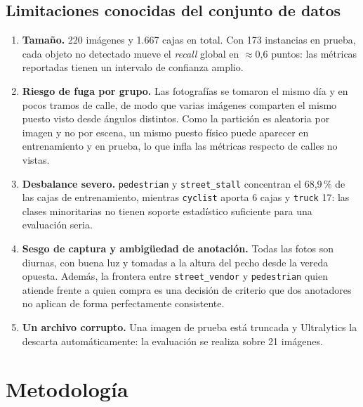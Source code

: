 \documentclass[10pt,a4paper]{article}
\begin{document}
\subsection{Limitaciones conocidas del conjunto de datos}
\begin{enumerate}[leftmargin=*]
  \item \textbf{Tamaño.} 220 imágenes y 1{.}667 cajas en total. Con 173 instancias en
        prueba, cada objeto no detectado mueve el \emph{recall} global en $\approx$0{,}6
        puntos: las métricas reportadas tienen un intervalo de confianza amplio.
  \item \textbf{Riesgo de fuga por grupo.} Las fotografías se tomaron el mismo día y en
        pocos tramos de calle, de modo que varias imágenes comparten el mismo puesto
        visto desde ángulos distintos. Como la partición es aleatoria por imagen y no por
        escena, un mismo puesto físico puede aparecer en entrenamiento y en prueba, lo
        que infla las métricas respecto de calles no vistas.
  \item \textbf{Desbalance severo.} \texttt{pedestrian} y \texttt{street\_stall}
        concentran el 68{,}9\,\% de las cajas de entrenamiento, mientras \texttt{cyclist}
        aporta 6 cajas y \texttt{truck} 17: las clases minoritarias no tienen soporte
        estadístico suficiente para una evaluación seria.
  \item \textbf{Sesgo de captura y ambigüedad de anotación.} Todas las fotos son diurnas,
        con buena luz y tomadas a la altura del pecho desde la vereda opuesta. Además, la
        frontera entre \texttt{street\_vendor} y \texttt{pedestrian} quien atiende
        frente a quien compra es una decisión de criterio que dos anotadores no aplican
        de forma perfectamente consistente.
  \item \textbf{Un archivo corrupto.} Una imagen de prueba está truncada y Ultralytics
        la descarta automáticamente: la evaluación se realiza sobre 21 imágenes.
\end{enumerate}

\section{Metodología}
\end{document}
